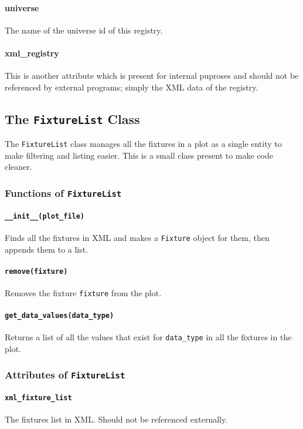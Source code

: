 \documentclass[a4paper]{article}
\begin{document}
\paragraph{universe}
The name of the universe id of this registry.

\paragraph{xml\_registry}
This is another attribute which is present for internal puproses and should 
not be referenced by external programs; simply the XML data of the registry.

\subsection{The \texttt{FixtureList} Class}
The \texttt{FixtureList} class manages all the fixtures in a plot as a single 
entity to make filtering and listing easier. This is a small class present 
to make code cleaner.

\subsubsection{Functions of \texttt{FixtureList}}

\paragraph{\texttt{\_\_init\_\_(plot\_file)}}
Finds all the fixtures in XML and makes a \texttt{Fixture} object for them, 
then appends them to a list.

\paragraph{\texttt{remove(fixture)}}
Removes the fixture \texttt{fixture} from the plot.

\paragraph{\texttt{get\_data\_values(data\_type)}}
Returns a list of all the values that exist for \texttt{data\_type} in all the 
fixtures in the plot.

\subsubsection{Attributes of \texttt{FixtureList}}

\paragraph{\texttt{xml\_fixture\_list}}
The fixtures list in XML. Should not be referenced externally.
\end{document}
